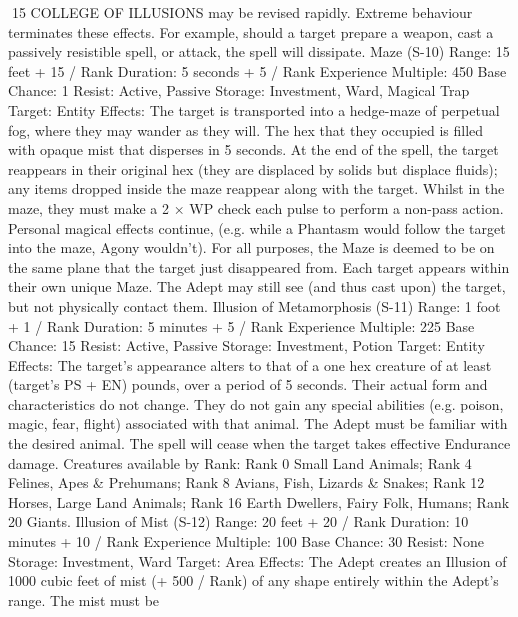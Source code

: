 \documentclass[a4paper]{article}
\begin{document}
\begin{multicols}{3}
15 COLLEGE OF ILLUSIONS
may be revised rapidly. Extreme behaviour terminates these effects. For example, should a target
prepare a weapon, cast a passively resistible spell,
or attack, the spell will dissipate.
Maze (S-10)
Range: 15 feet + 15 / Rank
Duration: 5 seconds + 5 / Rank
Experience Multiple: 450
Base Chance: 1%
Resist: Active, Passive
Storage: Investment, Ward, Magical Trap
Target: Entity
Effects: The target is transported into a hedge-maze
of perpetual fog, where they may wander as they
will. The hex that they occupied is filled with
opaque mist that disperses in 5 seconds. At the end
of the spell, the target reappears in their original
hex (they are displaced by solids but displace fluids); any items dropped inside the maze reappear
along with the target. Whilst in the maze, they
must make a 2 × WP check each pulse to perform a
non-pass action. Personal magical effects continue,
(e.g. while a Phantasm would follow the target into
the maze, Agony wouldn’t). For all purposes, the
Maze is deemed to be on the same plane that the
target just disappeared from. Each target appears
within their own unique Maze. The Adept may still
see (and thus cast upon) the target, but not physically contact them.
Illusion of Metamorphosis (S-11)
Range: 1 foot + 1 / Rank
Duration: 5 minutes + 5 / Rank
Experience Multiple: 225
Base Chance: 15%
Resist: Active, Passive
Storage: Investment, Potion
Target: Entity
Effects: The target’s appearance alters to that of a
one hex creature of at least (target’s PS + EN)
pounds, over a period of 5 seconds. Their actual
form and characteristics do not change. They do
not gain any special abilities (e.g. poison, magic,
fear, flight) associated with that animal. The Adept
must be familiar with the desired animal. The spell
will cease when the target takes effective Endurance damage. Creatures available by Rank: Rank 0
Small Land Animals; Rank 4 Felines, Apes &
Prehumans; Rank 8 Avians, Fish, Lizards &
Snakes; Rank 12 Horses, Large Land Animals;
Rank 16 Earth Dwellers, Fairy Folk, Humans;
Rank 20 Giants.
Illusion of Mist (S-12)
Range: 20 feet + 20 / Rank
Duration: 10 minutes + 10 / Rank
Experience Multiple: 100
Base Chance: 30%
Resist: None
Storage: Investment, Ward
Target: Area
Effects: The Adept creates an Illusion of 1000
cubic feet of mist (+ 500 / Rank) of any shape
entirely within the Adept’s range. The mist must be


\end{multicols}
\end{document}
